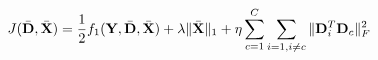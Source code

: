 \documentclass{standalone}
\begin{document}
$ \displaystyle
J(\bar{\mathbf{D}}, \bar{\mathbf{X}}) = \frac{1}{2} f_1(\mathbf{Y}, \bar{\mathbf{D}}, \bar{\mathbf{X}}) + \lambda \|\bar{\mathbf{X}}\|_1 + \eta\sum_{c=1}^C \sum_{i=1, i\neq c}\|\mathbf{D}_i^T\mathbf{D}_c\|_F^2
$\\
\end{document}

